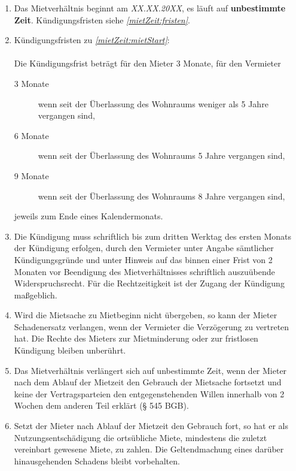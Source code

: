 \documentclass{scrreprt}[12pt,a4paper,twoside,duplex]
\newcommand{\mietBeginn}{\textcolor{zuBearbeiten}{XX.XX.20XX}}
\begin{document}
\begin{contract}

\begin{enumerate}
  \item\label{mietZeit:mietStart} Das Mietverhältnis beginnt am
  \textsl{\mietBeginn}, es läuft auf \textbf{unbestimmte Zeit}. Kün\-di\-gungs\-fris\-ten siehe \textsl{\ref{mietZeit:fristen}}.
  \item\label{mietZeit:fristen} Kün\-di\-gungs\-fris\-ten zu
  \textsl{\ref{mietZeit:mietStart}}:\\\\
  Die Kün\-di\-gungs\-frist beträgt für den Mieter 3 Monate, für den Vermieter\\
  \begin{description}
    \item[3 Monate] wenn seit der Überlassung des Wohnraums weniger als 5 Jahre
    vergangen sind,
    \item[6 Monate] wenn seit der Überlassung des Wohnraums 5 Jahre vergangen
    sind,
    \item[9 Monate] wenn seit der Überlassung des Wohnraums 8 Jahre vergangen
    sind,
  \end{description}
  jeweils zum Ende eines Kalendermonats.
  \item Die Kündigung muss schriftlich bis zum dritten Werktag des ersten Monats
  der Kündigung erfolgen, durch den Vermieter unter Angabe sämtlicher
  Kün\-di\-gungs\-grün\-de und unter Hinweis auf das binnen einer Frist von 2 Monaten
  vor Beendigung des Mietverhältnisses schriftlich auszuübende Widerspruchsrecht.
  Für die Rechtzeitigkeit ist der Zugang der Kündigung maßgeblich.
  \item Wird die Mietsache zu Mietbeginn nicht übergeben, so kann der Mieter Schadenersatz verlangen, wenn der Vermieter die Verzögerung zu vertreten hat. Die Rechte des Mieters zur Mietminderung oder zur fristlosen Kündigung bleiben unberührt.
 \item Das Mietverhältnis verlängert sich auf unbestimmte Zeit, wenn der Mieter nach dem Ablauf der Mietzeit den Gebrauch der Mietsache fortsetzt und keine der Vertragsparteien den entgegenstehenden Willen innerhalb von 2 Wochen dem anderen Teil erklärt (§ 545 BGB).
 \item Setzt der Mieter nach Ablauf der Mietzeit den Gebrauch fort, so hat er als Nutzungsentschädigung die ortsübliche Miete, mindestens die zuletzt vereinbart gewesene Miete, zu zahlen. Die Geltendmachung eines darüber hinausgehenden Schadens bleibt vorbehalten.
\end{enumerate}
\end{contract}
\end{document}
